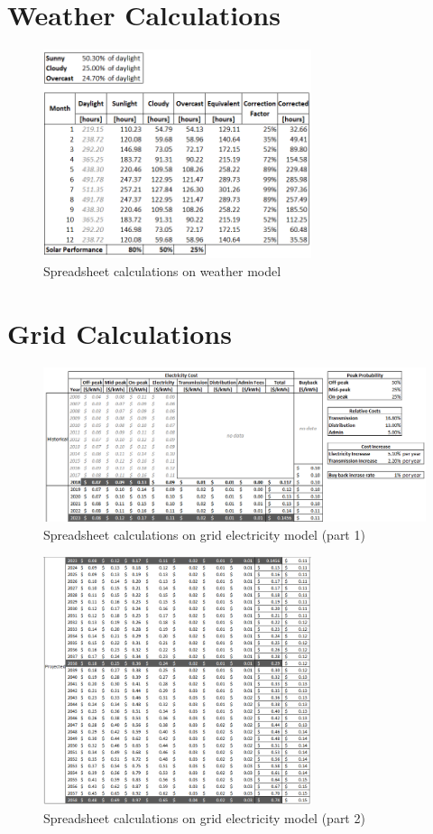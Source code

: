 \documentclass[10pt,letterpaper]{article}
\begin{document}
\section{Weather Calculations}\label{appendix:weather}
\begin{figure}[H]
	\centering
	\includegraphics[width=0.7\textwidth]{assets/1534568826258}
	\caption{Spreadsheet calculations on weather model}
\end{figure}

\clearpage
\section{Grid Calculations}\label{appendix:grid}
\begin{figure}[H]
	\centering
	\includegraphics[width=1.0\textwidth]{assets/1534568955354}
	\caption{Spreadsheet calculations on grid electricity model (part 1)}
\end{figure}

\begin{figure}[H]
	\centering
	\includegraphics[width=0.7\textwidth]{assets/1534568977509}
	\caption{Spreadsheet calculations on grid electricity model (part 2)}
\end{figure}
\end{document}
